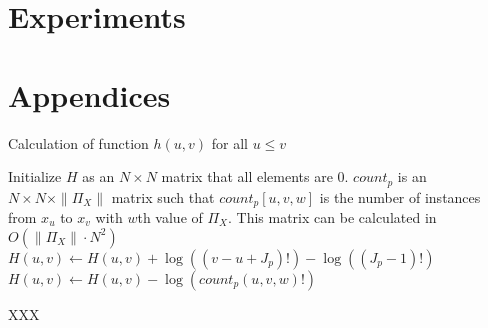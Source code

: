 
\section{Experiments}
\label{sec:experiments}









\section*{Appendices}

\begin{algorithm}
\caption{ Calculation of function $h(u,v)$ for all $u \leq v$}\label{euclid}
\begin{algorithmic}[1]
\State Initialize $H$ as an $N \times N$ matrix that all elements are 0.
\State $count_p$ is an $N \times N \times \|\Pi_X\|$ matrix such that $count_p [u,v,w]$ is the number of instances from $x_u$ to $x_v$ with $w$th value of $\Pi_X$. This matrix can be calculated in $O(\|\Pi_X\| \cdot N^2)$
\State $H(u,v) \leftarrow H(u,v) + \log((v-u + J_p)!) - \log((J_p -1)!)$
\State $H(u,v) \leftarrow H(u,v) - \log( count_p(u,v,w)!)$
\EndFor
\EndFor
\EndFor

\State XXX
\EndFor
\end{algorithmic}
\end{algorithm}



